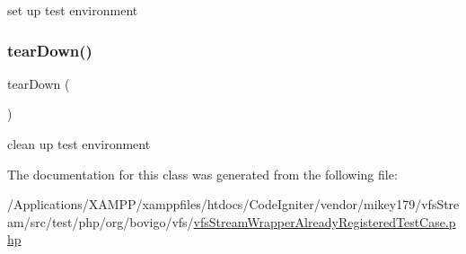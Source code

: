 set up test environment \mbox{\label{classorg_1_1bovigo_1_1vfs_1_1vfs_stream_wrapper_already_registered_test_case_a80fe3d17e658907fc75346a0ec9d6fc7}} 
\subsubsection{\texorpdfstring{tear\+Down()}{tearDown()}}
{\footnotesize\ttfamily tear\+Down (\begin{DoxyParamCaption}{ }\end{DoxyParamCaption})}

clean up test environment 

The documentation for this class was generated from the following file\+:\begin{DoxyCompactItemize}
\item 
/\+Applications/\+X\+A\+M\+P\+P/xamppfiles/htdocs/\+Code\+Igniter/vendor/mikey179/vfs\+Stream/src/test/php/org/bovigo/vfs/\mbox{\hyperlink{vfs_stream_wrapper_already_registered_test_case_8php}{vfs\+Stream\+Wrapper\+Already\+Registered\+Test\+Case.\+php}}\end{DoxyCompactItemize}
